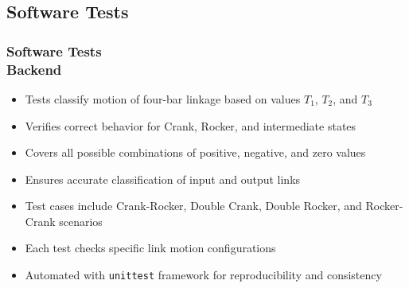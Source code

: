 \documentclass[ucs,10pt]{beamer}
\begin{document}

\subsection{Software Tests}

\begin{frame}
    \frametitle{Software Tests \\
    \small \color{rwth-blue} Backend}
    
    \begin{itemize}
        \item Tests classify motion of four-bar linkage based on values \( T_1 \), \( T_2 \), and \( T_3 \)
        \item Verifies correct behavior for Crank, Rocker, and intermediate states
        \item Covers all possible combinations of positive, negative, and zero values
        \item Ensures accurate classification of input and output links
        \item Test cases include Crank-Rocker, Double Crank, Double Rocker, and Rocker-Crank scenarios
        \item Each test checks specific link motion configurations
        \item Automated with \texttt{unittest} framework for reproducibility and consistency
    \end{itemize}
    
\end{frame}
\end{document}
